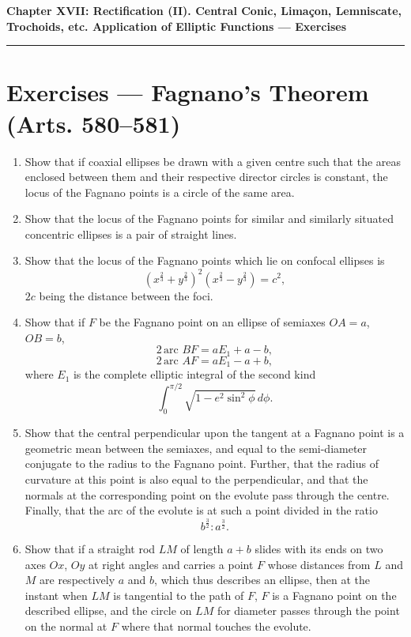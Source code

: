 \documentclass[11pt, a4paper]{article}
\begin{document}
\begin{center}
    {\LARGE \bfseries \color{accent} Chapter XVII: Rectification (II). Central Conic, Limaçon, Lemniscate, Trochoids, etc. Application of Elliptic Functions --- Exercises}\\
    \vspace{0.2cm}
    {\color{accent}\rule{0.55\linewidth}{0.8pt}}
\end{center}
\vspace{0.35cm}

\section*{Exercises --- Fagnano's Theorem (Arts. 580--581)}

\begin{enumerate}[leftmargin=2em]

\item Show that if coaxial ellipses be drawn with a given centre such that the areas enclosed between them and their respective director circles is constant, the locus of the Fagnano points is a circle of the same area.

\item Show that the locus of the Fagnano points for similar and similarly situated concentric ellipses is a pair of straight lines.

\item Show that the locus of the Fagnano points which lie on confocal ellipses is
\[
(x^{\frac23}+y^{\frac23})^2(x^{\frac23}-y^{\frac23})=c^2,
\]
$2c$ being the distance between the foci.

\item Show that if $F$ be the Fagnano point on an ellipse of semiaxes $OA=a$, $OB=b$,
\[
2\,\text{arc }BF=aE_1+a-b,
\]
\[
2\,\text{arc }AF=aE_1-a+b,
\]
where $E_1$ is the complete elliptic integral of the second kind
\[
\int_0^{\pi/2}\sqrt{1-e^2\sin^2\phi}\,d\phi.
\]

\item Show that the central perpendicular upon the tangent at a Fagnano point is a geometric mean between the semiaxes, and equal to the semi-diameter conjugate to the radius to the Fagnano point. Further, that the radius of curvature at this point is also equal to the perpendicular, and that the normals at the corresponding point on the evolute pass through the centre. Finally, that the arc of the evolute is at such a point divided in the ratio
\[
b^{\frac32}:a^{\frac32}.
\]

\item Show that if a straight rod $LM$ of length $a+b$ slides with its ends on two axes $Ox$, $Oy$ at right angles and carries a point $F$ whose distances from $L$ and $M$ are respectively $a$ and $b$, which thus describes an ellipse, then at the instant when $LM$ is tangential to the path of $F$, $F$ is a Fagnano point on the described ellipse, and the circle on $LM$ for diameter passes through the point on the normal at $F$ where that normal touches the evolute.


\end{enumerate}
\end{document}
